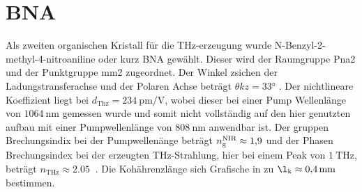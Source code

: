 \section{BNA}

Als zweiten organischen Kristall für die THz-erzeugung wurde N-Benzyl-2-methyl-4-nitroaniline oder kurz BNA gewählt. 
Dieser wird der Raumgruppe Pna2 und der Punktgruppe mm2 zugeordnet. 
Der Winkel zsichen der Ladungstransferachse und der Polaren Achse beträgt $\theta k z = 33°$ \cite{Jazbinsek2019}. 
Der nichtlineare Koeffizient liegt bei $d_\text{Thz}=\SI{234}{\pico\meter\per\volt}$, wobei dieser bei einer Pump 
Wellenlänge von $\SI{1064}{\nano\meter}$ gemessen wurde und somit nicht vollständig auf den hier genutzten aufbau mit einer 
Pumpwellenlänge von $\SI{808}{\nano\meter}$ anwendbar ist. 
Der gruppen Brechungsindix bei der Pumpwellenänge beträgt $n_\text g^\text{NIR}\approx \SI{1.9}{}$ und der Phasen Brechungsindex bei der 
erzeugten THz-Strahlung, hier bei einem Peak von $\SI{1}{\tera\hertz}$, beträgt $n_\text{THz}\approx\SI{2.05}{}$ \cite{Mansourzadeh2023}. 
Die Kohährenzlänge sich Grafische in \cite{miyamoto2009optimized} zu $\l_\text{k}\approx \SI{0.4}{\milli\meter}$ bestimmen. 


